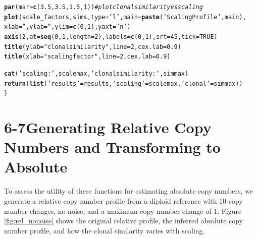 \documentclass[12pt]{article}\usepackage[]{graphicx}\usepackage[]{color}
\makeatletter
\newcommand{\hlnum}[1]{\textcolor[rgb]{0.686,0.059,0.569}{#1}}%
\newcommand{\hlstr}[1]{\textcolor[rgb]{0.192,0.494,0.8}{#1}}%
\newcommand{\hlcom}[1]{\textcolor[rgb]{0.678,0.584,0.686}{\textit{#1}}}%
\newcommand{\hlstd}[1]{\textcolor[rgb]{0.345,0.345,0.345}{#1}}%
\newcommand{\hlkwc}[1]{\textcolor[rgb]{0.333,0.667,0.333}{#1}}%
\newcommand{\hlkwd}[1]{\textcolor[rgb]{0.737,0.353,0.396}{\textbf{#1}}}%
\newenvironment{kframe}{%
 \def\at@end@of@kframe{}%
 \ifinner\ifhmode%
  \def\at@end@of@kframe{\end{minipage}}%
  \begin{minipage}{\columnwidth}%
 \fi\fi%
 \def\FrameCommand##1{\hskip\@totalleftmargin \hskip-\fboxsep
 \colorbox{shadecolor}{##1}\hskip-\fboxsep
     \hskip-\linewidth \hskip-\@totalleftmargin \hskip\columnwidth}%
 \MakeFramed {\advance\hsize-\width
   \@totalleftmargin\z@ \linewidth\hsize
   \@setminipage}}%
 {\par\unskip\endMakeFramed%
 \at@end@of@kframe}
\newenvironment{knitrout}{}{} %
\makeatother
\begin{document}
\begin{knitrout}
\begin{kframe}
\begin{alltt}
  \hlkwd{par}\hlstd{(}\hlkwc{mar} \hlstd{=} \hlkwd{c}\hlstd{(}\hlnum{3.5}\hlstd{,}\hlnum{3.5}\hlstd{,}\hlnum{1.5}\hlstd{,}\hlnum{1}\hlstd{))} \hlcom{#plot clonal similarity vs scaling}
  \hlkwd{plot}\hlstd{(scale_factors, sims,} \hlkwc{type}\hlstd{=}\hlstr{'l'}\hlstd{,} \hlkwc{main}\hlstd{=}\hlkwd{paste}\hlstd{(}\hlstr{'Scaling Profile'}\hlstd{, main),}
       \hlkwc{xlab} \hlstd{=} \hlstr{''}\hlstd{,} \hlkwc{ylab} \hlstd{=} \hlstr{''}\hlstd{,} \hlkwc{ylim} \hlstd{=} \hlkwd{c}\hlstd{(}\hlnum{0}\hlstd{,}\hlnum{1}\hlstd{),} \hlkwc{yaxt}\hlstd{=}\hlstr{'n'}\hlstd{)}
  \hlkwd{axis}\hlstd{(}\hlnum{2}\hlstd{,} \hlkwc{at} \hlstd{=} \hlkwd{seq}\hlstd{(}\hlnum{0}\hlstd{,} \hlnum{1}\hlstd{,} \hlkwc{length} \hlstd{=} \hlnum{2}\hlstd{),} \hlkwc{labels}\hlstd{=}\hlkwd{c}\hlstd{(}\hlnum{0}\hlstd{,}\hlnum{1}\hlstd{) ,}\hlkwc{srt}\hlstd{=}\hlnum{45}\hlstd{,}\hlkwc{tick}\hlstd{=}\hlnum{TRUE}\hlstd{)}
  \hlkwd{title}\hlstd{(}\hlkwc{ylab}\hlstd{=}\hlstr{"clonal similarity"}\hlstd{,} \hlkwc{line}\hlstd{=}\hlnum{2}\hlstd{,} \hlkwc{cex.lab}\hlstd{=}\hlnum{0.9}\hlstd{)}
  \hlkwd{title}\hlstd{(}\hlkwc{xlab}\hlstd{=}\hlstr{"scaling factor"}\hlstd{,} \hlkwc{line}\hlstd{=}\hlnum{2}\hlstd{,} \hlkwc{cex.lab}\hlstd{=}\hlnum{0.9}\hlstd{)}

  \hlkwd{cat}\hlstd{(}\hlstr{'scaling:'}\hlstd{, scalemax,} \hlstr{'clonal similarity:'}\hlstd{, simmax)}
  \hlkwd{return}\hlstd{(}\hlkwd{list}\hlstd{(}\hlstr{'results'}\hlstd{=results,} \hlstr{'scaling'}\hlstd{=scalemax,} \hlstr{'clonal'}\hlstd{=simmax))}
\hlstd{\}}
\end{alltt}
\end{kframe}
\end{knitrout}

\newpage

\section*{6-7\quad Generating Relative Copy Numbers and Transforming to Absolute}
To assess the utility of these functions for estimating absolute copy numbers, we generate a relative copy number profile from a diploid reference with 10 copy number changes, no noise, and a maximum copy number change of 1. Figure \ref{fig:rel_nonoise} shows the original relative profile, the inferred absolute copy number profile, and how the clonal similarity varies with scaling.
\end{document}
